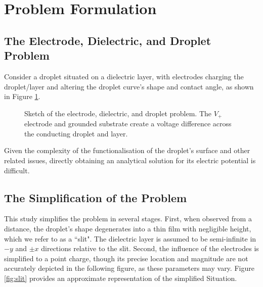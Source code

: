 
\section{Problem Formulation}
\subsection{The Electrode, Dielectric, and Droplet Problem}
\hspace{0em}\indent Consider a droplet situated on a dielectric layer, with electrodes charging the droplet/layer and altering the droplet curve's shape and contact angle, as shown in Figure \ref{fig:sketch electrode}.
    \begin{figure}[H]
        \centering
        \caption{\small Sketch of the electrode, dielectric, and droplet problem. The $V_+$ electrode and grounded substrate create a voltage difference across the conducting droplet and layer.}
        \label{fig:sketch electrode}
    \end{figure}
Given the complexity of the functionalisation of the droplet's surface and other related issues, directly obtaining an analytical solution for its electric potential is difficult.

\subsection{The Simplification of the Problem}
\hspace{0em}\indent This study simplifies the problem in several stages. First, when observed from a distance, the droplet's shape degenerates into a thin film with negligible height, which we refer to as a ``slit". The dielectric layer is assumed to be semi-infinite in $-y$ and $\pm x$ directions relative to the slit. Second, the influence of the electrodes is simplified to a point charge, though its precise location and magnitude are not accurately depicted in the following figure, as these parameters may vary. Figure \ref{fig:slit} provides an approximate representation of the simplified Situation.

